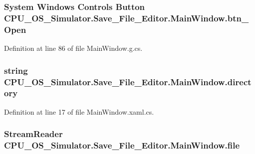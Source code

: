 \subsubsection[{btn\+\_\+\+Open}]{\setlength{\rightskip}{0pt plus 5cm}System Windows Controls Button C\+P\+U\+\_\+\+O\+S\+\_\+\+Simulator.\+Save\+\_\+\+File\+\_\+\+Editor.\+Main\+Window.\+btn\+\_\+\+Open\hspace{0.3cm}{\ttfamily [package]}}\label{class_c_p_u___o_s___simulator_1_1_save___file___editor_1_1_main_window_a353c2ed525a145ca1034f96605ffeb73}


Definition at line 86 of file Main\+Window.\+g.\+cs.

\hypertarget{class_c_p_u___o_s___simulator_1_1_save___file___editor_1_1_main_window_a8867f09d94a620533db5c8bad03f0c96}{}
\subsubsection[{directory}]{\setlength{\rightskip}{0pt plus 5cm}string C\+P\+U\+\_\+\+O\+S\+\_\+\+Simulator.\+Save\+\_\+\+File\+\_\+\+Editor.\+Main\+Window.\+directory\hspace{0.3cm}{\ttfamily [private]}}\label{class_c_p_u___o_s___simulator_1_1_save___file___editor_1_1_main_window_a8867f09d94a620533db5c8bad03f0c96}


Definition at line 17 of file Main\+Window.\+xaml.\+cs.

\hypertarget{class_c_p_u___o_s___simulator_1_1_save___file___editor_1_1_main_window_a991061ea935a2bd7571b32b5b2cce64d}{}
\subsubsection[{file}]{\setlength{\rightskip}{0pt plus 5cm}Stream\+Reader C\+P\+U\+\_\+\+O\+S\+\_\+\+Simulator.\+Save\+\_\+\+File\+\_\+\+Editor.\+Main\+Window.\+file\hspace{0.3cm}{\ttfamily [private]}}\label{class_c_p_u___o_s___simulator_1_1_save___file___editor_1_1_main_window_a991061ea935a2bd7571b32b5b2cce64d}


